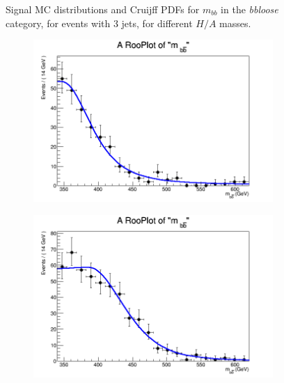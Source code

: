 \begin{figure}[phtb!]
\begin{center}
  \caption{Signal MC distributions and Cruijff PDFs for $m_{bb}$ in the {\it bbloose} category, for events with 3 jets, for different $H/A$ masses. \label{fig:signalPDFs_4j_bbloose}}
    \end{center}
\end{figure}


\begin{figure}[phtb!]
  \begin{center}
  \begin{subfigure}[$m_{A}=400$ GeV]{0.4\textwidth}\includegraphics[width=\textwidth]{FitResults/images/fitMC_bAbb400_6.png}\end{subfigure}
  \begin{subfigure}[$m_{A}=450$ GeV]{0.4\textwidth}\includegraphics[width=\textwidth]{FitResults/images/fitMC_bAbb450_6.png}\end{subfigure}

\end{center}
\end{figure}
